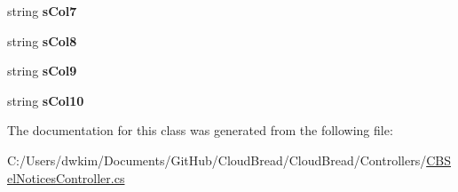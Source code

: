 \begin{DoxyCompactItemize}
\item 
string {\bfseries s\+Col7}\hypertarget{a00165_aeeaa8564b8510384f450091465d8319b}{}\label{a00165_aeeaa8564b8510384f450091465d8319b}

\item 
string {\bfseries s\+Col8}\hypertarget{a00165_ab098018cfc60c72d661eac3874141e3a}{}\label{a00165_ab098018cfc60c72d661eac3874141e3a}

\item 
string {\bfseries s\+Col9}\hypertarget{a00165_a68f11b47d86ff0c7e0d75bc070290885}{}\label{a00165_a68f11b47d86ff0c7e0d75bc070290885}

\item 
string {\bfseries s\+Col10}\hypertarget{a00165_a344b3c659fd15c59246a0009b72408e5}{}\label{a00165_a344b3c659fd15c59246a0009b72408e5}

\end{DoxyCompactItemize}


The documentation for this class was generated from the following file\+:\begin{DoxyCompactItemize}
\item 
C\+:/\+Users/dwkim/\+Documents/\+Git\+Hub/\+Cloud\+Bread/\+Cloud\+Bread/\+Controllers/\hyperlink{a00225}{C\+B\+Sel\+Notices\+Controller.\+cs}\end{DoxyCompactItemize}
